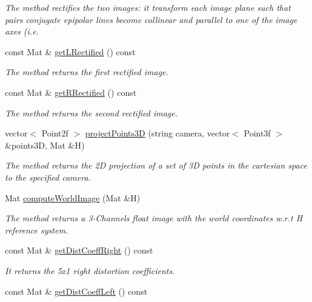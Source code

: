 \begin{DoxyCompactItemize}
\begin{DoxyCompactList}\small\item\em The method rectifies the two images\+: it transform each image plane such that pairs conjugate epipolar lines become collinear and parallel to one of the image axes (i.\+e. \end{DoxyCompactList}\item 
const Mat \& \mbox{\hyperlink{classStereoCamera_ad81c9f7f4f15ef3f1e61d34fd8df9856}{get\+L\+Rectified}} () const
\begin{DoxyCompactList}\small\item\em The method returns the first rectified image. \end{DoxyCompactList}\item 
const Mat \& \mbox{\hyperlink{classStereoCamera_aff19b07a766c01d04ed623a05ef4d67d}{get\+R\+Rectified}} () const
\begin{DoxyCompactList}\small\item\em The method returns the second rectified image. \end{DoxyCompactList}\item 
vector$<$ Point2f $>$ \mbox{\hyperlink{classStereoCamera_a03406c9d31c1b765a8d6ef9641222309}{project\+Points3D}} (string camera, vector$<$ Point3f $>$ \&points3D, Mat \&H)
\begin{DoxyCompactList}\small\item\em The method returns the 2D projection of a set of 3D points in the cartesian space to the specified camera. \end{DoxyCompactList}\item 
Mat \mbox{\hyperlink{classStereoCamera_a52ef2f3401488e5c4fa6badd1336f96d}{compute\+World\+Image}} (Mat \&H)
\begin{DoxyCompactList}\small\item\em The method returns a 3-\/Channels float image with the world coordinates w.\+r.\+t H reference system. \end{DoxyCompactList}\item 
const Mat \& \mbox{\hyperlink{classStereoCamera_a589ca8eb4ebfc4377589a77bb15b85b7}{get\+Dist\+Coeff\+Right}} () const
\begin{DoxyCompactList}\small\item\em It returns the 5x1 right distortion coefficients. \end{DoxyCompactList}\item 
const Mat \& \mbox{\hyperlink{classStereoCamera_af9e52f941837f0db26d150d0ca4ff3bc}{get\+Dist\+Coeff\+Left}} () const

\end{DoxyCompactItemize}
